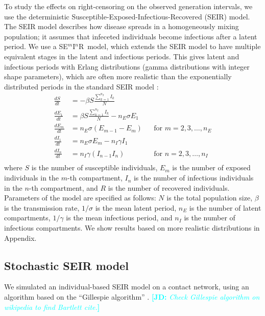 \documentclass[12pt]{article}
\newcommand{\seminar}{SE\mbox{$^m$}I\mbox{$^n$}R}
\newcommand{\comment}[3]{\textcolor{#1}{\textbf{[#2: }\textsl{#3}\textbf{]}}}
\newcommand{\jd}[1]{\comment{cyan}{JD}{#1}}
\begin{document}
To study the effects on right-censoring on the observed generation intervals, we use the deterministic Susceptible-Exposed-Infectious-Recovered (SEIR) model.
The SEIR model describes how disease spreads in a homogeneously mixing population; it assumes that infeceted individuals become infectious after a latent period.
We use a \seminar\ model, which extends the SEIR model to have multiple equivalent stages in the latent and infectious periods. This gives latent and infectious periods with Erlang distributions (gamma distributions with integer shape parameters), which are often more realistic than the exponentially distributed periods in the standard SEIR model \citep{anderson1980spread, bailey1964some}: 
\begin{equation}
\begin{aligned}
\frac{dS}{dt} &= - \beta S \frac{\sum_{k=1}^{n_I} I_k}{N}\\
\frac{dE_1}{dt} &= \beta S \frac{\sum_{k=1}^{n_I} I_k}{N} - n_E \sigma E_1\\
\frac{dE_m}{dt} &= n_E \sigma (E_{m-1} - E_m) && \text{for } m = 2, 3, \dots, n_E\\
\frac{dI_1}{dt} &= n_E \sigma E_m - n_I \gamma I_1\\
\frac{dI_n}{dt} &= n_I \gamma (I_{n-1} I_n) && \text{for } n = 2, 3, \dots, n_I\\
\end{aligned}
\end{equation}
where $S$ is the number of susceptible individuals, $E_m$ is the number of exposed individuals in the $m$-th compartment, $I_n$ is the number of infectious individuals in the $n$-th compartment, and $R$ is the number of recovered individuals.
Parameters of the model are specified as follows: $N$ is the total population size, $\beta$ is the transmission rate, $1/\sigma$ is the mean latent period, $n_E$ is the number of latent compartments, $1/\gamma$ is the mean infectious period, and $n_I$ is the number of infectious compartments.
We show results based on more realistic distributions in Appendix.

\subsection{Stochastic SEIR model}

We simulated an individual-based SEIR model on a contact network, using an algorithm based on the ``Gillespie algorithm'' \cite{Bartlett,gillespie1977exact}. \jd{Check Gillespie algorithm on wikipedia to find Bartlett cite.}
\end{document}
